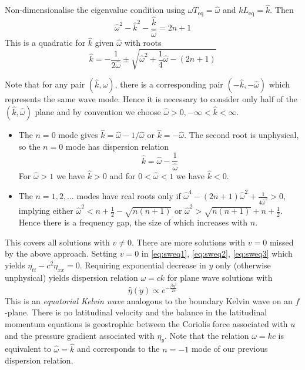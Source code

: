 \documentclass{jknotes}
\begin{document}
Non-dimensionalise the eigenvalue condition using $\omega T_{\text{eq}} =
\hat{\omega}$ and $k L_{\text{eq}} = \hat{k}$. Then
\begin{equation}
	\hat{\omega}^2 - \hat{k}^2 - \frac{\hat{k}}{\hat{\omega}} = 2n+1
\end{equation}
This is a quadratic for $\hat{k}$ given $\hat{\omega}$ with roots
\begin{equation}
	\hat{k} = -\frac{1}{2\hat{\omega}} \pm \sqrt{\hat{\omega}^2 +
	\frac{1}{4}\hat{\omega} - (2n+1)}
\end{equation}

Note that for any pair $(\hat{k}, \hat{\omega})$, there is a corresponding
pair $(-\hat{k},-\hat{\omega})$ which represents the same wave mode. Hence it
is necessary to consider only half of the $(\hat{k}, \hat{\omega})$ plane and
by convention we choose $\hat{\omega} > 0, -\infty < \hat{k} < \infty$. 

\begin{itemize}
	\item The $n=0$ mode gives $\hat{k} = \hat{\omega} - 1/\hat{\omega}$ or
		$\hat{k} = -\hat{\omega}$. The second root is unphysical, so the $n=0$
		mode has dispersion relation
		\begin{equation}
			\hat{k} = \hat{\omega} - \frac{1}{\hat{\omega}}
		\end{equation}
		For $\hat{\omega} > 1$ we have $\hat{k} > 0$ and for $0 < \hat{\omega}
		< 1$ we have $\hat{k} < 0$.
	\item The $n = 1, 2, \dots$ modes have real roots only if $\hat{\omega}^4
		- (2n+1)\hat{\omega}^2 + \frac{1}{4\hat{\omega}^2} > 0$, implying
		either $\hat{\omega}^2 < n+\frac{1}{2}-\sqrt{n(n+1)}$ or
		$\hat{\omega}^2 > \sqrt{n(n+1)} + n + \frac{1}{2}$. Hence there is a
		frequency gap, the size of which increases with $n$.
\end{itemize}

This covers all solutions with $v \ne 0$. There are more solutions with $v =
0$ missed by the above approach. Setting $v=0$ in
\eqref{eq:sweq1}, \eqref{eq:sweq2}, \eqref{eq:sweq3} which yields $\eta_{tt} -
c^2 \eta_{xx} = 0$. Requiring exponential decrease in $y$ only (otherwise
unphysical) yields dispersion relation $\omega = ck$ for plane wave solutions
with
\begin{equation}
	\hat{\eta}(y) \propto e^{-\frac{\beta y^2}{2c}}
\end{equation}
This is an \emph{equatorial Kelvin wave} analogous to the boundary Kelvin wave
on an $f$-plane. There is no latitudinal velocity and the balance in the
latitudinal momentum equations is geostrophic between the Coriolis force
associated with $u$ and the pressure gradient associated with $\eta_y$. Note
that the relation $\omega = kc$ is equivalent to $\hat{\omega} = \hat{k}$ and
corresponds to the $n=-1$ mode of our previous dispersion relation.
\end{document}
